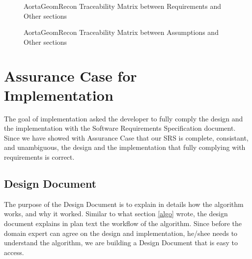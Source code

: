 \begin{itemize}
\begin{figure}[H]
    \centering
    \caption[[AortaGeomRecon Traceability Matrix between Requirements and Other sections]{AortaGeomRecon Traceability Matrix between Requirements and Other sections}
    \label{fig_agr_tm_im_r}
\end{figure}

\begin{figure}[H]
    \centering
    \caption[AortaGeomRecon Traceability Matrix between Assumptions and Other sections]{AortaGeomRecon Traceability Matrix between Assumptions and Other sections}
    \label{fig_agr_tm_a}
\end{figure}


\end{itemize}

\section{Assurance Case for Implementation}
The goal of implementation asked the developer to fully comply the design and the implementation with the Software Requirements Specification document. Since we have showed with Assurance Case that our SRS is complete, consistant, and unambiguous, the design and the implementation that fully complying with requirements is correct.

\subsection{Design Document}
The purpose of the Design Document is to explain in details how the algorithm works, and why it worked. Similar to what section \ref{algo} wrote, the design document explains in plan text the workflow of the algorithm. Since before the domain expert can agree on the design and implementation, he/shee needs to understand the algorithm, we are building a Design Document that is easy to access. 

